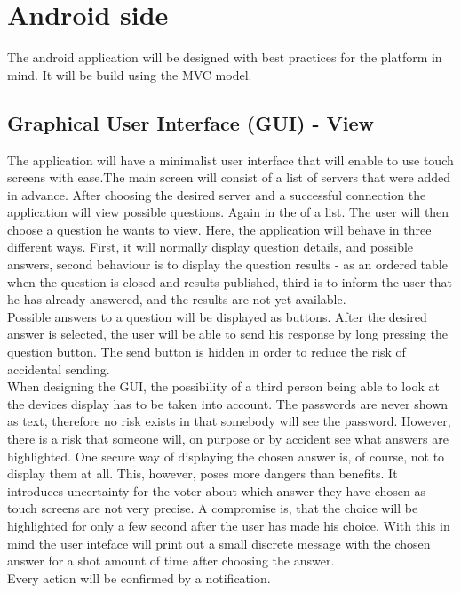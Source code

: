 \documentclass[11pt,twoside,a4paper]{book}
\begin{document}
\section{Android side}
The android application will be designed with best practices for the platform in mind. It will be build using the MVC model\cite{whatIsMVC}.

\subsection{Graphical User Interface (GUI) - View}
The application will have a minimalist user interface that will enable to use touch screens with ease.The main screen will consist of a list of servers that were added in advance. After choosing the desired server and a successful connection the application will view possible questions. Again in the of a list. The user will then choose a question he wants to view. Here, the application will behave in three different ways. First, it will normally display question details, and possible answers, second behaviour is to display the question results - as an ordered table when the question is closed and results published, third is to inform the user that he has already answered, and the results are not yet available.  \\
Possible answers to a question will be displayed as  buttons. After the desired answer is selected, the user will be able to send his response by long pressing the question button. The send button is hidden in order to reduce the risk of accidental sending. \\
When designing the GUI, the possibility of a third person being able to look at the devices display has to be taken into account. The passwords are never shown as text, therefore no risk exists in that somebody will see the password. However, there is a risk that someone will, on purpose or by accident see what answers are highlighted. One secure way of displaying the chosen answer is, of course, not to display them at all. This, however, poses more dangers than benefits. It introduces uncertainty for the voter about which answer they have chosen as touch screens are not very precise. A compromise is, that the choice will be highlighted for only a few second after the user has made his choice. With this in mind the user inteface will print out a small discrete message with the chosen answer for a shot amount of time after choosing the answer. \\
Every action will be confirmed by a notification.\cite{bakalarkaJV}	
\end{document}
